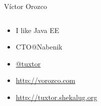 \documentclass{beamer}
\begin{document}
\begin{frame}{Víctor Orozco}
\begin{columns}[T] %
	\begin{column}[T]{6cm} %
		\begin{itemize}
			\item I like Java EE
			\item CTO@Nabenik
			\item \href{https://twitter.com/tuxtor}{@tuxtor}
			\item \href{http://vorozco.com}{http://vorozco.com}
			\item \href{http://tuxtor.shekalug.org}{http://tuxtor.shekalug.org} 
		\end{itemize}
	\end{column}
	\begin{column}[T]{4cm} %
		\begin{figure}
			\centering

\end{figure}
\end{column}
\end{columns}
\end{frame}
\end{document}
